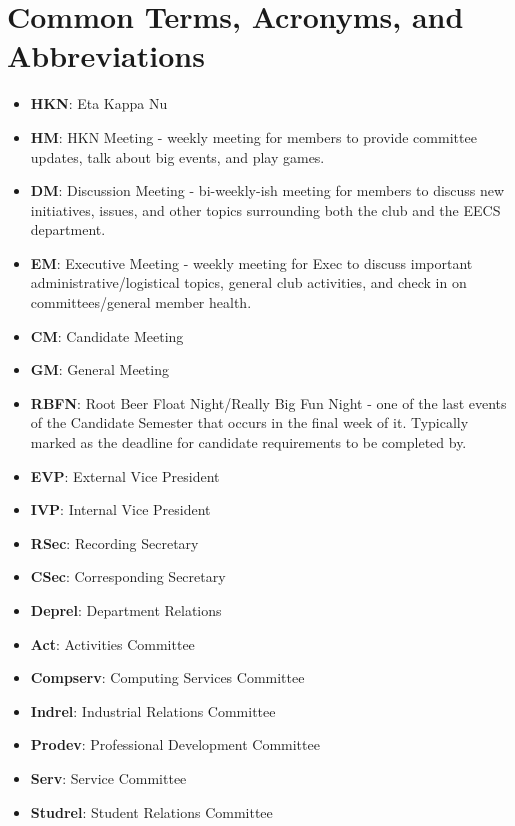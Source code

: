 \documentclass[11pt, article, oneside]{memoir}
\begin{document}
    \chapter{Common Terms, Acronyms, and Abbreviations}
    \begin{itemize}
        \item \textbf{HKN}: Eta Kappa Nu
        \item \textbf{HM}: HKN Meeting - weekly meeting for members to provide committee updates, talk about big events, and play games.
        \item \textbf{DM}: Discussion Meeting - bi-weekly-ish meeting for members to discuss new initiatives, issues, and other topics surrounding both the club and the EECS department.
        \item \textbf{EM}: Executive Meeting - weekly meeting for Exec to discuss important administrative/logistical topics, general club activities, and check in on committees/general member health.
        \item \textbf{CM}: Candidate Meeting
        \item \textbf{GM}: General Meeting
        \item \textbf{RBFN}: Root Beer Float Night/Really Big Fun Night - one of the last events of the Candidate Semester that occurs in the final week of it. Typically marked as the deadline for candidate requirements to be completed by.
        \item \textbf{EVP}: External Vice President
        \item \textbf{IVP}: Internal Vice President
        \item \textbf{RSec}: Recording Secretary
        \item \textbf{CSec}: Corresponding Secretary
        \item \textbf{Deprel}: Department Relations
        \item \textbf{Act}: Activities Committee
        \item \textbf{Compserv}: Computing Services Committee
        \item \textbf{Indrel}: Industrial Relations Committee
        \item \textbf{Prodev}: Professional Development Committee
        \item \textbf{Serv}: Service Committee
        \item \textbf{Studrel}: Student Relations Committee
    \end{itemize}
    
\end{document}
